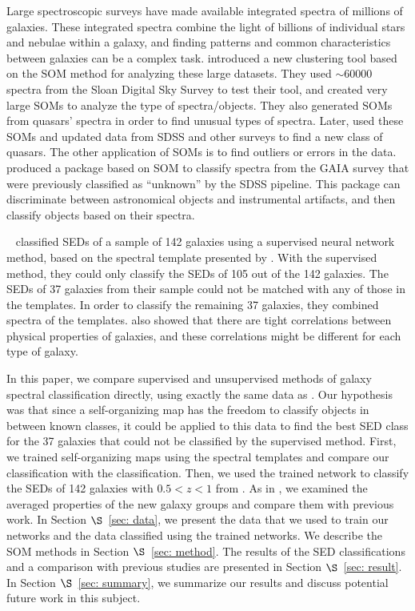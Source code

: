 Large spectroscopic surveys have made available integrated spectra of millions of galaxies.
These integrated spectra combine the light of billions of individual stars and nebulae within a galaxy, and
finding patterns and common characteristics between galaxies can be a complex task.
\citet{In12} introduced a new clustering tool based on the SOM method for analyzing these large datasets.
They used $\sim 60000$ spectra from the Sloan Digital Sky Survey \citep[SDSS;][]{Abazajian09} to test their tool, and created very large SOMs to analyze the type of spectra/objects.
They also generated SOMs from quasars' spectra in order to find unusual types of spectra. 
Later, \citet{Meusinger16} used these SOMs and updated data from SDSS and other surveys to find a new class of quasars.
The other application of SOMs is to find outliers or errors in the data.
\citet{Fustes13} produced a package based on SOM to classify spectra from the GAIA survey that were previously classified as ``unknown'' by the SDSS pipeline. This package can discriminate between astronomical objects and instrumental artifacts, and then classify objects based on their spectra. 

~\citet[][hereafter ]{Hossein12} classified SEDs of a sample of 142 galaxies using a supervised neural network method, based on the spectral template presented by .
With the supervised method, they could only classify the SEDs of 105 out of the 142 galaxies.
The SEDs of 37 galaxies from their sample could not be matched with any of those in the  templates. 
In order to classify the remaining 37 galaxies, they combined spectra of the  templates.
 also showed that there are tight correlations between physical properties of galaxies, and these correlations might be different for each type of galaxy.

In this paper, we compare supervised and unsupervised methods of galaxy spectral classification directly, using exactly the same data as .  
Our hypothesis was that since a self-organizing map has the freedom to classify objects in between known classes, it could be applied to this data 
to find the best SED class for the 37 galaxies that could not be classified by the supervised method.
First, we trained self-organizing maps using the  spectral templates and compare our classification with the  classification.
Then, we used the trained network to classify the SEDs of 142 galaxies with $0.5 < z < 1$ from . 
As in , we examined the averaged properties of the new galaxy groups and compare them with previous work.
In Section $\S$~\ref{sec: data}, we present the data that we used to train our networks and the data classified using the trained networks.  
We describe the SOM methods in Section $\S$~\ref{sec: method}. 
The results of the SED classifications and a comparison with previous studies are presented in Section $\S$~\ref{sec: result}. 
In Section $\S$~\ref{sec: summary}, we summarize our results and discuss potential future work in this subject.
